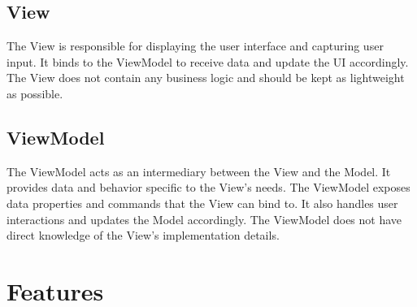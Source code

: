 \subsection{View}
The View is responsible for displaying the user interface and capturing user input. It binds to the ViewModel to receive data and update the UI accordingly. The View does not contain any business logic and should be kept as lightweight as possible.
\subsection{ViewModel}
The ViewModel acts as an intermediary between the View and the Model. It provides data and behavior specific to the View's needs. The ViewModel exposes data properties and commands that the View can bind to. It also handles user interactions and updates the Model accordingly. The ViewModel does not have direct knowledge of the View's implementation details.

\section{Features}
